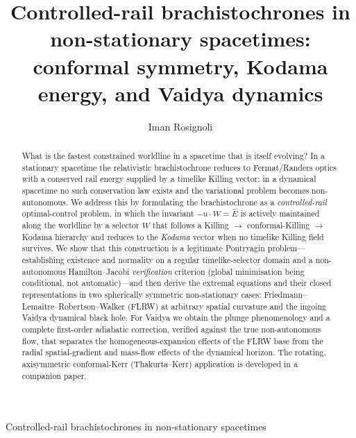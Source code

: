 \documentclass[12pt]{iopart}
\newcommand{\Ehat}{\hat E}
\theoremstyle{plain}
\theoremstyle{definition}
\theoremstyle{plain}
\theoremstyle{remark}
\begin{document}
\title{Controlled-rail brachistochrones in non-stationary spacetimes:
conformal symmetry, Kodama energy, and Vaidya dynamics}

\author{Iman Rosignoli}
\address{Department of Physics, University of Pavia, Via A.\ Bassi 6, 27100 Pavia, Italy}

\begin{abstract}
What is the fastest constrained worldline in a spacetime that is itself evolving? In a
stationary spacetime the relativistic brachistochrone reduces to Fermat/Randers optics
with a conserved rail energy supplied by a timelike Killing vector; in a dynamical
spacetime no such conservation law exists and the variational problem becomes
non-autonomous. We address this by formulating the brachistochrone as a
\emph{controlled-rail} optimal-control problem, in which the invariant $-u\cdot W=\Ehat$ is
actively maintained along the worldline by a selector $W$ that follows a Killing $\to$
conformal-Killing $\to$ Kodama hierarchy and reduces to the \emph{Kodama} vector when no
timelike Killing field survives. We show that this construction is a legitimate
Pontryagin problem---establishing existence and normality on a regular timelike-selector
domain and a non-autonomous Hamilton--Jacobi \emph{verification} criterion (global
minimisation being conditional, not automatic)---and then derive the extremal equations
and their closed representations in two spherically symmetric non-stationary cases:
Friedmann--Lema\^itre--Robertson--Walker (FLRW) at arbitrary spatial curvature and the
ingoing Vaidya dynamical black hole. For Vaidya we obtain the plunge phenomenology and a complete
first-order adiabatic correction, verified against the true non-autonomous flow, that
separates the homogeneous-expansion effects of the FLRW base from the radial
spatial-gradient and mass-flow effects of the dynamical horizon. The rotating,
axisymmetric conformal-Kerr (Thakurta--Kerr)
application is developed in a companion paper.
\end{abstract}

\maketitle
%
         {Controlled-rail brachistochrones in non-stationary spacetimes}
\end{document}
